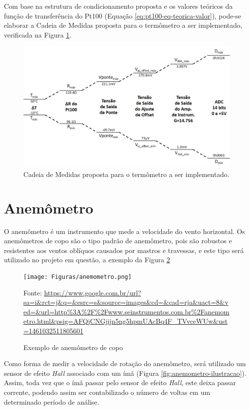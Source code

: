 \documentclass[a4paper]{instrumentacao}
\begin{document}
Com base na estrutura de condicionamento proposta e os valores teóricos da função de transferência do Pt100 (Equação \ref{eq:pt100-eq-teorica-valor}), pode-se elaborar a Cadeia de Medidas proposta para o termômetro a ser implementado, verificada na Figura \ref{fig:termometro-cadeia-medidas-proposta}.

\begin{figure}[H]
	\centering \includegraphics[width=\textwidth]{termometro-cadeia-medidas-proposta.jpg}
	\caption{Cadeia de Medidas proposta para o termômetro a ser implementado.}
	\label{fig:termometro-cadeia-medidas-proposta}
\end{figure}

\section{Anemômetro}
O anemômetro é um instrumento que mede a velocidade do vento horizontal. Os anemômetros de copo são o tipo padrão de anemômetro, pois são robustos e resistentes aos ventos oblíquos causados por mastros e travessas, e este tipo será utilizado no projeto em questão, a exemplo da Figura \ref{fig:anemometro}

\begin{figure}[h]
	\centering
		\texttt{[image: Figuras/anemometro.png]}
	\caption{Exemplo de anemômetro de copo}
	Fonte: \url{https://www.google.com.br/url?sa=i&rct=j&q=&esrc=s&source=images&cd=&cad=rja&uact=8&ved=&url=http\%3A\%2F\%2Fwww.seinstrumentos.com.br\%2Fanemometro.html&psig=AFQjCNGjijn5ng5hpmUAcBq4F_TVvceWUw&ust=1461032511805601}
	\label{fig:anemometro}
\end{figure}

Como forma de medir a velocidade de rotação do anemômetro, será utilizado um sensor de efeito \textit{Hall} associado com um ímã (Figura \ref{fig:anemometro-ilustracao}). Assim, toda vez que o ímã passar pelo sensor de efeito \textit{Hall}, este deixa passar corrente, podendo assim ser contabilizado o número de voltas em um determinado período de análise.
\end{document}
